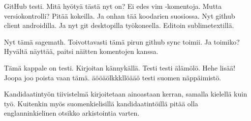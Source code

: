 \documentclass[12pt,a4paper,finnish]{tutthesis}
\begin{document}
GitHub testi. Mitä hyötyä tästä nyt on? Ei edes vim -komentoja.
Mutta versiokontrolli? Pitää kokeilla. Ja onhan tää koodarien
suosiossa. Nyt github client androidilla. Ja nyt git desktopilla
työkoneella. Editoin sublimetextillä.

Nyt tämä sagemath. Toivottavasti tämä pirun github sync toimii.
Ja toimiko? Hyvältä näyttää, paitsi näitten komentojen kanssa.

Tämä kappale on testi. Kirjoitan kännykällä.
Testi testi älämölö. Hehe lisää!
Joopa joo poista vaan tämä.
äööäölkkkllöääö testi suomen näppäimistö.

Kandidaatintyön tiivistelmä kirjoitetaan ainoastaan kerran, samalla
kielellä kuin työ. Kuitenkin myös suomenkielisillä kandidaatintöillä
pitää olla englanninkielinen otsikko arkistointia varten.



%
%
%
%
\end{document}
